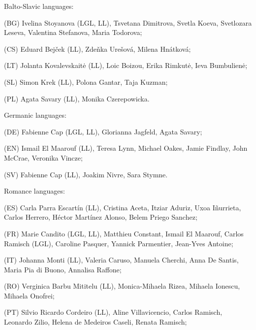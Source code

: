 \documentclass[output=paper,modfonts]{langscibook}
\begin{document}
\noindent Balto-Slavic languages:
 \begin{sitem}
 \item (BG) Ivelina Stoyanova (LGL, LL), Tsvetana Dimitrova, Svetla Koeva, Svetlozara Leseva, Valentina Stefanova, Maria Todorova;
 \item (CS) Eduard Bejček (LL), Zdeňka Urešová, Milena Hnátková;
 \item (LT) Jolanta Kovalevskait\.e (LL), Loic Boizou, Erika Rimkut\.e, Ieva Bumbulien\.e;
 \item (SL) Simon Krek (LL), Polona Gantar, Taja Kuzman;
 \item (PL) Agata Savary (LL), Monika Czerepowicka.
 \end{sitem} 

\noindent Germanic languages:
 \begin{sitem}
 \item (DE) Fabienne Cap (LGL, LL), Glorianna Jagfeld, Agata Savary;
 \item (EN) Ismail El Maarouf (LL), Teresa Lynn, Michael Oakes, Jamie Findlay, John McCrae, Veronika Vincze;
 \item (SV) Fabienne Cap (LL), Joakim Nivre, Sara Stymne.
 \end{sitem} 

\noindent Romance languages:
 \begin{sitem}
 \item (ES) Carla Parra Escartín (LL), Cristina Aceta, Itziar Aduriz, Uxoa Iñurrieta, Carlos Herrero, Héctor Martínez Alonso, Belem Priego Sanchez;
 \item (FR) Marie Candito (LGL, LL), Matthieu Constant, Ismail El Maarouf, Carlos Ramisch (LGL), Caroline Pasquer, Yannick Parmentier, Jean-Yves Antoine;
 \item (IT) Johanna Monti (LL), Valeria Caruso, Manuela Cherchi, Anna De Santis, Maria Pia di Buono, Annalisa Raffone;
 \item (RO) Verginica Barbu Mititelu (LL), Monica-Mihaela Rizea, Mihaela Io\-nes\-cu, Mihaela Onofrei;
 \item (PT) Silvio Ricardo Cordeiro (LL), Aline Villavicencio, Carlos Ramisch, Le\-o\-nar\-do Zilio, Helena de Medeiros Caseli, Renata Ramisch;
 \end{sitem}
\end{document}

